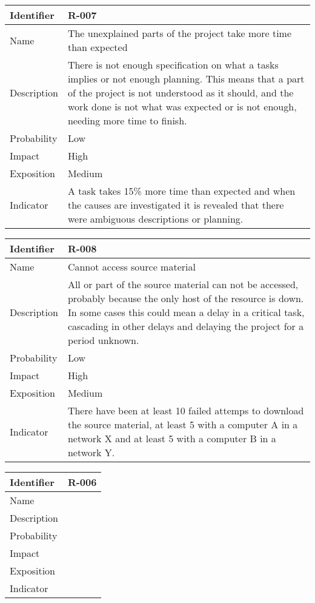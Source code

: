 \begin{table}[H]
	\begin{tabularx}{\textwidth}{|l|X|}
		\hline
		\rowcolor{gray!30}
		Identifier & \textbf{R-007} \\ \hline
		Name & The unexplained parts of the project take more time than expected\\ \hline
		Description & There is not enough specification on what a tasks implies or not enough planning. This means that a part of the project is not understood as it should, and the work done is not what was expected or is not enough, needing more time to finish. \\ \hline
		Probability & Low\\ \hline
		Impact &  High\\ \hline
		Exposition &  Medium\\ \hline
		Indicator & A task takes 15\% more time than expected and when the causes are investigated it is revealed that there were ambiguous descriptions or planning.\\ \hline
	\end{tabularx}
\end{table}
\begin{table}[H]
	\begin{tabularx}{\textwidth}{|l|X|}
		\hline
		\rowcolor{gray!30}
		Identifier & \textbf{R-008} \\ \hline
		Name & Cannot access source material\\ \hline
		Description & All or part of the source material can not be accessed, probably because the only host of the resource is down. In some cases this could mean a delay in a critical task, cascading in other delays and delaying the project for a period unknown.\\ \hline
		Probability & Low\\ \hline
		Impact & High\\ \hline
		Exposition & Medium\\ \hline
		Indicator & There have been at least 10 failed attemps to download the source material, at least 5 with a computer A in a network X and at least 5 with a computer B in a network Y.\\ \hline
	\end{tabularx}
\end{table}
\begin{table}[H]
	\begin{tabularx}{\textwidth}{|l|X|}
		\hline
		\rowcolor{gray!30}
		Identifier & \textbf{R-006} \\ \hline
		Name & \\ \hline
		Description & \\ \hline
		Probability & \\ \hline
		Impact &  \\ \hline
		Exposition &  \\ \hline
		Indicator & \\ \hline
	\end{tabularx}
\end{table}
